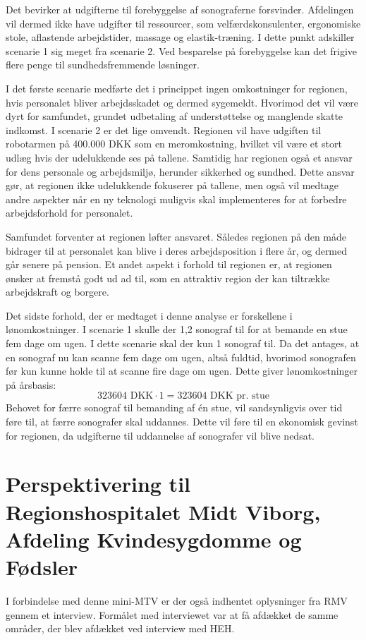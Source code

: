 Det bevirker at udgifterne til forebyggelse af sonograferne forsvinder. Afdelingen vil dermed ikke have udgifter til ressourcer, som velfærdskonsulenter, ergonomiske stole, aflastende arbejdstider, massage og elastik-træning. I dette punkt adskiller scenarie 1 sig meget fra scenarie 2. Ved besparelse på forebyggelse kan det frigive flere penge til sundhedsfremmende løsninger.

I det første scenarie medførte det i princippet ingen omkostninger for regionen, hvis personalet bliver arbejdsskadet og dermed sygemeldt. Hvorimod det vil være dyrt for samfundet, grundet udbetaling af understøttelse og manglende skatte indkomst. I scenarie 2 er det lige omvendt. Regionen vil have udgiften til robotarmen på 400.000 DKK som en meromkostning, hvilket vil være et stort udlæg hvis der udelukkende ses på tallene. Samtidig har regionen også et ansvar for dens personale og arbejdsmiljø, herunder sikkerhed og sundhed. Dette ansvar gør, at regionen ikke udelukkende fokuserer på tallene, men også vil medtage andre aspekter når en ny teknologi muligvis skal implementeres for at forbedre arbejdsforhold for personalet. 

Samfundet forventer at regionen løfter ansvaret. Således regionen på den måde bidrager til at personalet kan blive i deres arbejdsposition i flere år, og dermed går senere på pension. Et andet aspekt i forhold til regionen er, at regionen ønsker at fremstå godt ud ad til, som en attraktiv region der kan tiltrække arbejdskraft og borgere. 

Det sidste forhold, der er medtaget i denne analyse er forskellene i lønomkostninger. I scenarie 1 skulle der 1,2 sonograf til for at bemande en stue fem dage om ugen. I dette scenarie skal der kun 1 sonograf til. Da det antages, at en sonograf nu kan scanne fem dage om ugen, altså fuldtid, hvorimod sonografen før kun kunne holde til at scanne fire dage om ugen. Dette giver lønomkostninger på årsbasis:
\begin{equation}
323604 \text{ DKK}\cdot1 = 323604 \text{ DKK pr. stue}
\end{equation}
Behovet for færre sonograf til bemanding af én stue, vil sandsynligvis over tid føre til, at færre sonografer skal uddannes. Dette vil føre til en økonomisk gevinst for regionen, da udgifterne til uddannelse af sonografer vil blive nedsat. 

\section{Perspektivering til Regionshospitalet Midt Viborg, Afdeling Kvindesygdomme og Fødsler}
I forbindelse med denne mini-MTV er der også indhentet oplysninger fra RMV gennem et interview. Formålet med interviewet var at få afdækket de samme områder, der blev afdækket ved interview med HEH. 

